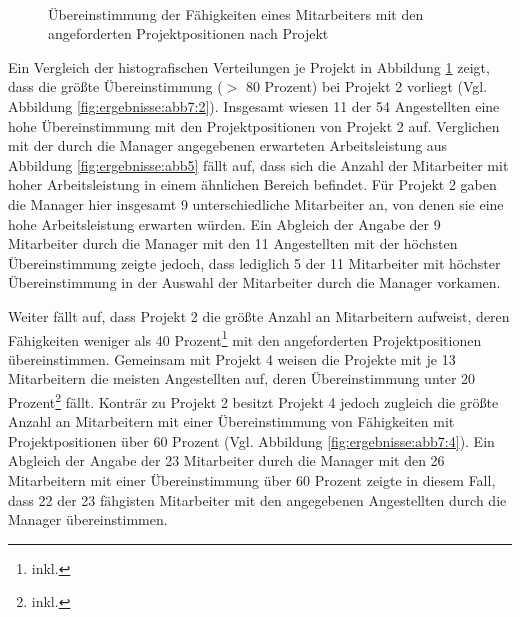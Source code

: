 \begin{figure}
    \\
\caption[Übereinstimmung der Fähigkeiten eines Mitarbeiters mit den angeforderten Projektpositionen nach Projekt]{Übereinstimmung der Fähigkeiten eines Mitarbeiters mit den angeforderten Projektpositionen nach Projekt}
  \label{fig:ergebnisse:abb7}
\end{figure}

Ein Vergleich der histografischen Verteilungen je Projekt in Abbildung \ref{fig:ergebnisse:abb7} zeigt, dass die größte Übereinstimmung ($>$ 80 Prozent) bei Projekt 2 vorliegt (Vgl. Abbildung \ref{fig:ergebnisse:abb7:2}).
Insgesamt wiesen 11 der 54 Angestellten eine hohe Übereinstimmung mit den Projektpositionen von Projekt 2 auf.
Verglichen mit der durch die Manager angegebenen erwarteten Arbeitsleistung aus Abbildung \ref{fig:ergebnisse:abb5} fällt auf, dass sich die Anzahl der Mitarbeiter mit hoher Arbeitsleistung in einem ähnlichen Bereich befindet.
Für Projekt 2 gaben die Manager hier insgesamt 9 unterschiedliche Mitarbeiter an, von denen sie eine hohe Arbeitsleistung erwarten würden.
Ein Abgleich der Angabe der 9 Mitarbeiter durch die Manager mit den 11 Angestellten mit der höchsten Übereinstimmung zeigte jedoch, dass lediglich 5 der 11 Mitarbeiter mit höchster Übereinstimmung in der Auswahl der Mitarbeiter durch die Manager vorkamen.

Weiter fällt auf, dass Projekt 2 die größte Anzahl an Mitarbeitern aufweist, deren Fähigkeiten weniger als 40 Prozent\footnote{inkl.} mit den angeforderten Projektpositionen übereinstimmen.
Gemeinsam mit Projekt 4 weisen die Projekte mit je 13 Mitarbeitern die meisten Angestellten auf, deren Übereinstimmung unter 20 Prozent\footnote{inkl.} fällt.
Konträr zu Projekt 2 besitzt Projekt 4 jedoch zugleich die größte Anzahl an Mitarbeitern mit einer Übereinstimmung von Fähigkeiten mit Projektpositionen über 60 Prozent (Vgl. Abbildung \ref{fig:ergebnisse:abb7:4}).
Ein Abgleich der Angabe der 23 Mitarbeiter durch die Manager mit den 26 Mitarbeitern mit einer Übereinstimmung über 60 Prozent zeigte in diesem Fall, dass 22 der 23 fähgisten Mitarbeiter mit den angegebenen Angestellten durch die Manager übereinstimmen.

